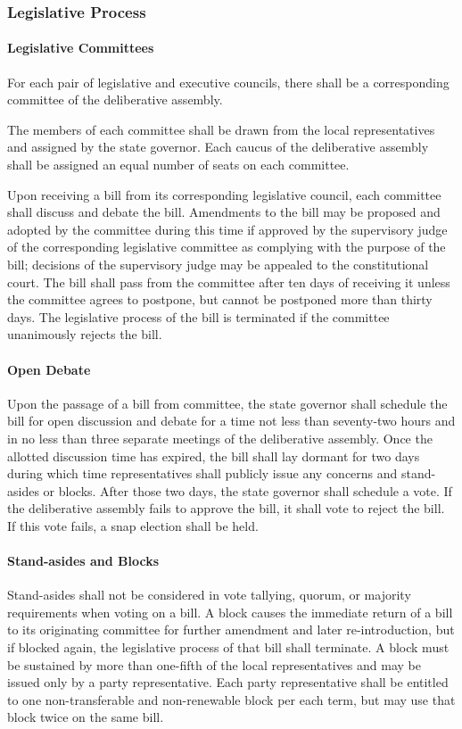 \documentclass{article}
\begin{document}
\subsubsection{Legislative Process}
\paragraph{Legislative Committees}
For each pair of legislative and executive councils, there shall be a corresponding committee of the deliberative assembly.

The members of each committee shall be drawn from the local representatives and assigned by the state governor. Each caucus of the deliberative assembly shall be assigned an equal number of seats on each committee. 

Upon receiving a bill from its corresponding legislative council, each committee shall discuss and debate the bill. Amendments to the bill may be proposed and adopted by the committee during this time if approved by the supervisory judge of the corresponding legislative committee as complying with the purpose of the bill; decisions of the supervisory judge may be appealed to the constitutional court. The bill shall pass from the committee after ten days of receiving it unless the committee agrees to postpone, but cannot be postponed more than thirty days. The legislative process of the bill is terminated if the committee unanimously rejects the bill.
\paragraph{Open Debate}
Upon the passage of a bill from committee, the state governor shall schedule the bill for open discussion and debate for a time not less than seventy-two hours and in no less than three separate meetings of the deliberative assembly. Once the allotted discussion time has expired, the bill shall lay dormant for two days during which time representatives shall publicly issue any concerns and stand-asides or blocks. After those two days, the state governor shall schedule a vote. If the deliberative assembly fails to approve the bill, it shall vote to reject the bill. If this vote fails, a snap election shall be held.
\paragraph{Stand-asides and Blocks}
Stand-asides shall not be considered in vote tallying, quorum, or majority requirements when voting on a bill. A block causes the immediate return of a bill to its originating committee for further amendment and later re-introduction, but if blocked again, the legislative process of that bill shall terminate. A block must be sustained by more than one-fifth of the local representatives and may be issued only by a party representative. Each party representative shall be entitled to one non-transferable and non-renewable block per each term, but may use that block twice on the same bill.
\end{document}
